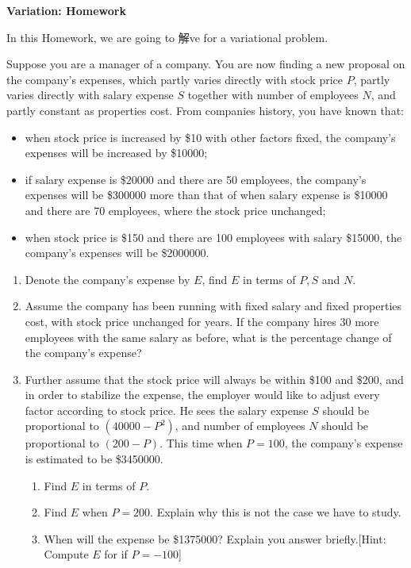 \documentclass[12pt]{article}
\begin{document}
    \begin{center}
        \textbf{Variation: Homework}
    \end{center}

    In this Homework, we are going to 解ve for a variational problem.

    Suppose you are a manager of a company. You are now finding a new proposal on the company's expenses, which partly varies directly with stock price $P$, partly varies directly with salary expense $S$ together with number of employees $N$, and partly constant as properties cost. From companies history, you have known that:\begin{itemize}
        \item when stock price is increased by \$10 with other factors fixed, the company's expenses will be increased by \$10000;
        \item if salary expense is \$20000 and there are 50 employees, the company's expenses will be \$300000 more than that of when salary expense is \$10000 and there are 70 employees, where the stock price unchanged;
        \item when stock price is \$150 and there are 100 employees with salary \$15000, the company's expenses will be \$2000000.
    \end{itemize}

    \begin{enumerate}
        \item Denote the company's expense by $E$, find $E$ in terms of $P,S$ and $N$.
        \item Assume the company has been running with fixed salary and fixed properties cost, with stock price unchanged for years. If the company hires 30 more employees with the same salary as before, what is the percentage change of the company's expense?
        \item Further assume that the stock price will always be within \$100 and \$200, and in order to stabilize the expense, the employer would like to adjust every factor according to stock price. He sees the salary expense $S$ should be proportional to $(40000-P^2)$, and number of employees $N$ should be proportional to $(200-P)$. This time when $P=100$, the company's expense is estimated to be \$3450000.\begin{enumerate}
            \item Find $E$ in terms of $P$.
            \item Find $E$ when $P=200$. Explain why this is not the case we have to study.
            \item When will the expense be \$1375000? Explain you answer briefly.[Hint: Compute $E$ for if $P=-100$]
        \end{enumerate}
    \end{enumerate}
\end{document}
